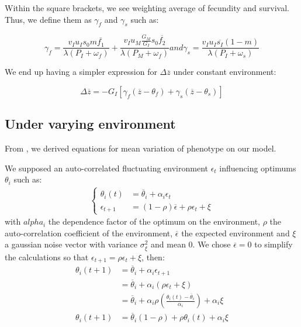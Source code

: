Within the square brackets, we see weighting average of fecundity and survival. Thus, we define them as $\gamma_{f}$ and $\gamma_{s}$ such as:

\begin{subequations}
	\begin{equation}
	\label{eq:gammaf}
	\gamma_{f} = \frac{v_{I} u_{I} s_{0} m \overline{f_{1}} }{\lambda(P_{I}+\omega_{f})} + \frac{ v_{I} u_{M} \frac{G_{M}}{G_{I}} s_{0} \overline{f_{2}}}{\lambda ( P_{M} + \omega_{f} )}
	\end{equation}
	and
	\begin{equation}
	\label{eq:gammas}
	\gamma_{s} = \frac{ v_{I} u_{I} \overline{s_{I}} (1-m) }{\lambda(P_{I}+\omega_{s})}
	\end{equation}
\end{subequations}

We end up having a simpler expression for $\Delta\overline{z}$ under constant environment:

\begin{equation}
	\Delta\overline{z} = -G_{I} \left[ \gamma_{f}(\overline{z} - \theta_{f}) + \gamma_{s}(\overline{z} - \theta_{s}) \right]
\end{equation}

\subsection*{Under varying environment}
From \citet{engen_evolution_2011}, we derived equations for mean variation of phenotype on our model.

We supposed an auto-correlated fluctuating environment $\epsilon_{t}$ influencing optimums $\theta_{i}$ such as:
\begin{align}
\left\{
	\begin{aligned}
		\theta_{i}(t) &= \overline{\theta}_{i} + \alpha_{i}\epsilon_{t}\\
		\epsilon_{t+1} &= (1-\rho)\overline{\epsilon} + \rho\epsilon_{t} + \xi
	\end{aligned}
\right.
\end{align} with $alpha_{i}$ the dependence factor of the optimum on the environment, $\rho$ the auto-correlation coefficient of the environment, $\overline{\epsilon}$ the expected environment and $\xi$ a gaussian noise vector with variance $\sigma^{2}_{\xi}$ and mean $0$. We chose $\overline{\epsilon}=0$ to simplify the calculations so that $\epsilon_{t+1} = \rho\epsilon_{t} + \xi$, then:
\begin{align}
	\theta_{i}(t+1) &= \overline{\theta}_{i} + \alpha_{i}\epsilon_{t+1} \nonumber \\
	&= \overline{\theta}_{i} + \alpha_{i}(\rho\epsilon_{t} + \xi) \nonumber \\
	&= \overline{\theta}_{i} + \alpha_{i}\rho(\frac{\theta_{i}(t)-\overline{\theta}_{i}}{\alpha_{i}}) + \alpha_{i}\xi \nonumber \\
	\theta_{i}(t+1) &= \overline{\theta}_{i}(1-\rho) + \rho\theta_{i}(t) + \alpha_{i}\xi
\end{align}

